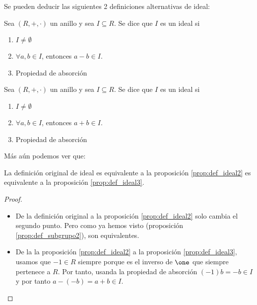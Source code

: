 Se pueden deducir las siguientes 2 definiciones alternativas de ideal:

\begin{prop}\label{prop:def_ideal2}
	Sea $(R,+,\cdot)$ un anillo y sea $I \subseteq R$. Se dice que $I$ es un ideal si

	\begin{enumerate}
		\item $I \neq \emptyset$
		\item $\forall a,b \in I$, entonces $a-b \in I$.
		\item Propiedad de absorción
	\end{enumerate}
\end{prop}
\begin{prop}\label{prop:def_ideal3}
	Sea $(R,+,\cdot)$ un anillo y sea $I \subseteq R$. Se dice que $I$ es un ideal si

	\begin{enumerate}
		\item $I \neq \emptyset$
		\item $\forall a,b \in I$, entonces $a+b \in I$.
		\item Propiedad de absorción
	\end{enumerate}
\end{prop}


Más aún podemos ver que:
\begin{prop}
	La definición original de ideal es equivalente a
	la proposición \ref{prop:def_ideal2} es equivalente a la proposición \ref{prop:def_ideal3}.
\end{prop}
\begin{proof}
	\begin{itemize}
		\item De la definición original a la proposición \ref{prop:def_ideal2} solo cambia el segundo punto. Pero como ya hemos visto (proposición \ref{prop:def_subgrupo2}), son equivalentes.
		\item De la la proposición \ref{prop:def_ideal2} a la proposición \ref{prop:def_ideal3}, usamos que $-1 \in R$ siempre porque es el inverso de $\one$ que siempre pertenece a $R$. Por tanto, usanda la propiedad de absorción $(-1)b=-b \in I$ y por tanto $a-(-b)=a+b \in I$.
	\end{itemize}
\end{proof}


